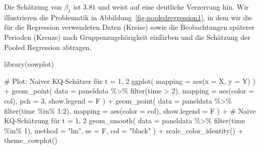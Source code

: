 \documentclass[
  a4paper,
  DIV=11,
  oneside]{scrreprt}
\newenvironment{Shaded}{\begin{snugshade}}{\end{snugshade}}
\newcommand{\AttributeTok}[1]{\textcolor[rgb]{0.40,0.45,0.13}{#1}}
\newcommand{\CommentTok}[1]{\textcolor[rgb]{0.37,0.37,0.37}{#1}}
\newcommand{\DecValTok}[1]{\textcolor[rgb]{0.68,0.00,0.00}{#1}}
\newcommand{\FunctionTok}[1]{\textcolor[rgb]{0.28,0.35,0.67}{#1}}
\newcommand{\NormalTok}[1]{\textcolor[rgb]{0.00,0.23,0.31}{#1}}
\newcommand{\SpecialCharTok}[1]{\textcolor[rgb]{0.37,0.37,0.37}{#1}}
\newcommand{\StringTok}[1]{\textcolor[rgb]{0.13,0.47,0.30}{#1}}
\begin{document}
Die Schätzung von \(\beta_1\) ist \(3.81\) und weist auf eine deutliche
Verzerrung hin. Wir illustrieren die Problematik in
Abbildung~\ref{fig-pooledregression1}, in dem wir die für die Regression
verwendeten Daten (Kreise) sowie die Beobachtungen späterer Perioden
(Kreuze) nach Gruppenzugehörigkeit einfärben und die Schätzung der
Pooled Regression abtragen.

\begin{Shaded}
\begin{Highlighting}[]
\FunctionTok{library}\NormalTok{(cowplot)}

\CommentTok{\# Plot: Naiver KQ{-}Schätzer für t = 1, 2}
\FunctionTok{ggplot}\NormalTok{(}
  \AttributeTok{mapping =} \FunctionTok{aes}\NormalTok{(}\AttributeTok{x =}\NormalTok{ X, }\AttributeTok{y =}\NormalTok{ Y)}
\NormalTok{) }\SpecialCharTok{+}
  \FunctionTok{geom\_point}\NormalTok{(}
    \AttributeTok{data =}\NormalTok{ paneldata }\SpecialCharTok{\%\textgreater{}\%} 
      \FunctionTok{filter}\NormalTok{(time }\SpecialCharTok{\textgreater{}} \DecValTok{2}\NormalTok{),}
    \AttributeTok{mapping =} \FunctionTok{aes}\NormalTok{(}\AttributeTok{color =}\NormalTok{ col),}
    \AttributeTok{pch =} \DecValTok{3}\NormalTok{,}
    \AttributeTok{show.legend =}\NormalTok{ F}
\NormalTok{  ) }\SpecialCharTok{+}
  \FunctionTok{geom\_point}\NormalTok{(}
    \AttributeTok{data =}\NormalTok{ paneldata }\SpecialCharTok{\%\textgreater{}\%} 
      \FunctionTok{filter}\NormalTok{(time }\SpecialCharTok{\%in\%} \DecValTok{1}\SpecialCharTok{:}\DecValTok{2}\NormalTok{),}
    \AttributeTok{mapping =} \FunctionTok{aes}\NormalTok{(}\AttributeTok{color =}\NormalTok{ col),}
    \AttributeTok{show.legend =}\NormalTok{ F}
\NormalTok{  ) }\SpecialCharTok{+}
  \CommentTok{\# Naive KQ{-}Schätzung für t = 1, 2}
  \FunctionTok{geom\_smooth}\NormalTok{(}
    \AttributeTok{data =}\NormalTok{ paneldata }\SpecialCharTok{\%\textgreater{}\%} 
      \FunctionTok{filter}\NormalTok{(time }\SpecialCharTok{\%in\%} \DecValTok{1}\NormalTok{),}
    \AttributeTok{method =} \StringTok{"lm"}\NormalTok{, }
    \AttributeTok{se =}\NormalTok{ F,}
    \AttributeTok{col =} \StringTok{"black"}
\NormalTok{  ) }\SpecialCharTok{+}
  \FunctionTok{scale\_color\_identity}\NormalTok{() }\SpecialCharTok{+}
  \FunctionTok{theme\_cowplot}\NormalTok{()}
\end{Highlighting}
\end{Shaded}
\end{document}
